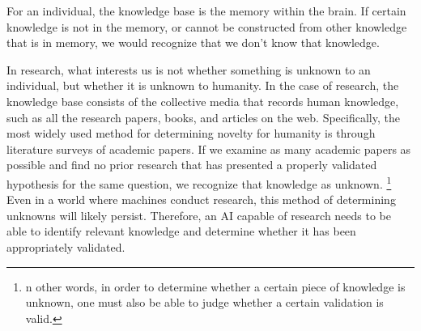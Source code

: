 
For an individual, the knowledge base is the memory within the brain. If certain knowledge is not in the memory, or cannot be constructed from other knowledge that is in memory, we would recognize that we don't know that knowledge. 




In research, what interests us is not whether something is unknown to an individual, but whether it is unknown to humanity. In the case of research, the knowledge base consists of the collective media that records human knowledge, such as all the research papers, books, and articles on the web. Specifically, the most widely used method for determining novelty for humanity is through literature surveys of academic papers. If we examine as many academic papers as possible and find no prior research that has presented a properly validated hypothesis for the same question, we recognize that knowledge as unknown. \footnote{
n other words, in order to determine whether a certain piece of knowledge is unknown, one must also be able to judge whether a certain validation is valid.
} Even in a world where machines conduct research, this method of determining unknowns will likely persist. Therefore, an AI capable of research needs to be able to identify relevant knowledge and determine whether it has been appropriately validated.


